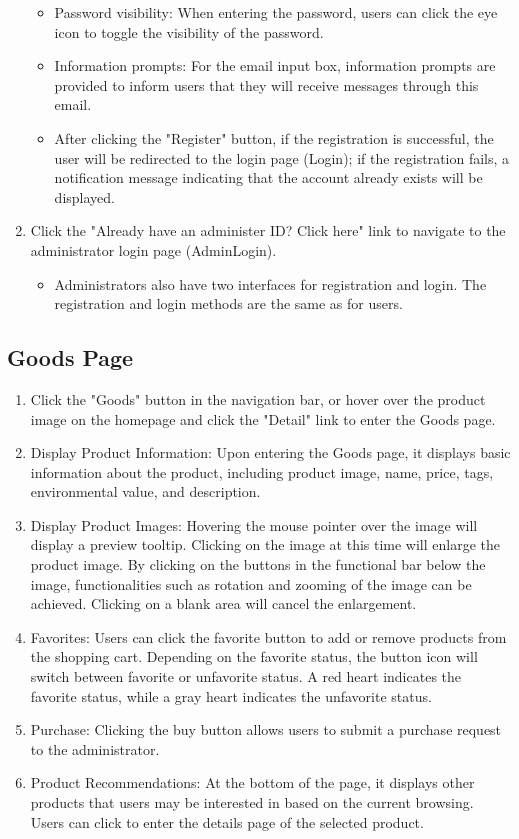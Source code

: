 \documentclass{article}
\begin{document}
\begin{enumerate}
\begin{itemize}
        \item Password visibility: When entering the password, users can click the eye icon to toggle the visibility of the password.
        \item Information prompts: For the email input box, information prompts are provided to inform users that they will receive messages through this email.
        \item After clicking the "Register" button, if the registration is successful, the user will be redirected to the login page (Login); if the registration fails, a notification message indicating that the account already exists will be displayed.
    \end{itemize}
    \item Click the "Already have an administer ID? Click here" link to navigate to the administrator login page (AdminLogin).
    \begin{itemize}
        \item Administrators also have two interfaces for registration and login. The registration and login methods are the same as for users.
    \end{itemize}
\end{enumerate}

\subsection{Goods Page}
\begin{enumerate}
    \item Click the "Goods" button in the navigation bar, or hover over the product image on the homepage and click the "Detail" link to enter the Goods page.
    \item Display Product Information: Upon entering the Goods page, it displays basic information about the product, including product image, name, price, tags, environmental value, and description.
    \item Display Product Images: Hovering the mouse pointer over the image will display a preview tooltip. Clicking on the image at this time will enlarge the product image. By clicking on the buttons in the functional bar below the image, functionalities such as rotation and zooming of the image can be achieved. Clicking on a blank area will cancel the enlargement.
    \item Favorites: Users can click the favorite button to add or remove products from the shopping cart. Depending on the favorite status, the button icon will switch between favorite or unfavorite status. A red heart indicates the favorite status, while a gray heart indicates the unfavorite status.
    \item Purchase: Clicking the buy button allows users to submit a purchase request to the administrator.
    \item Product Recommendations: At the bottom of the page, it displays other products that users may be interested in based on the current browsing. Users can click to enter the details page of the selected product.
\end{enumerate}
\end{document}
